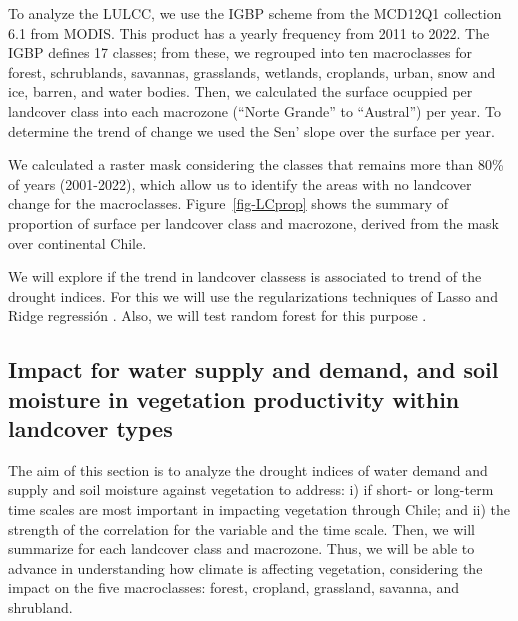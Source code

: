 \documentclass[
  number,
  preprint,
  3p,
  onecolumn]{elsarticle}
\begin{document}
To analyze the LULCC, we use the IGBP scheme from the MCD12Q1 collection
6.1 from MODIS. This product has a yearly frequency from 2011 to 2022.
The IGBP defines 17 classes; from these, we regrouped into ten
macroclasses for forest, schrublands, savannas, grasslands, wetlands,
croplands, urban, snow and ice, barren, and water bodies. Then, we
calculated the surface ocuppied per landcover class into each macrozone
(``Norte Grande'' to ``Austral'') per year. To determine the trend of
change we used the Sen' slope \citep{Sen1968} over the surface per year.

We calculated a raster mask considering the classes that remains more
than 80\% of years (2001-2022), which allow us to identify the areas
with no landcover change for the macroclasses. Figure~\ref{fig-LCprop}
shows the summary of proportion of surface per landcover class and
macrozone, derived from the mask over continental Chile.

We will explore if the trend in landcover classess is associated to
trend of the drought indices. For this we will use the regularizations
techniques of Lasso \citep{Tibshirani2010} and Ridge regressión
\citep{Hoerl1970}. Also, we will test random forest for this purpose
\citep{Ho1995}.

\hypertarget{impact-for-water-supply-and-demand-and-soil-moisture-in-vegetation-productivity-within-landcover-types}{%
\subsection{Impact for water supply and demand, and soil moisture in
vegetation productivity within landcover
types}\label{impact-for-water-supply-and-demand-and-soil-moisture-in-vegetation-productivity-within-landcover-types}}

The aim of this section is to analyze the drought indices of water
demand and supply and soil moisture against vegetation to address: i) if
short- or long-term time scales are most important in impacting
vegetation through Chile; and ii) the strength of the correlation for
the variable and the time scale. Then, we will summarize for each
landcover class and macrozone. Thus, we will be able to advance in
understanding how climate is affecting vegetation, considering the
impact on the five macroclasses: forest, cropland, grassland, savanna,
and shrubland.
\end{document}
